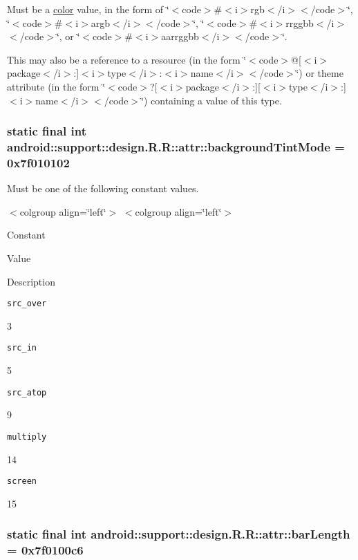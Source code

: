 Must be a \hyperlink{classandroid_1_1support_1_1design_1_1_r_1_1color}{color} value, in the form of \char`\"{}$<$code$>$\#$<$i$>$rgb$<$/i$>$$<$/code$>$\char`\"{}, \char`\"{}$<$code$>$\#$<$i$>$argb$<$/i$>$$<$/code$>$\char`\"{}, \char`\"{}$<$code$>$\#$<$i$>$rrggbb$<$/i$>$$<$/code$>$\char`\"{}, or \char`\"{}$<$code$>$\#$<$i$>$aarrggbb$<$/i$>$$<$/code$>$\char`\"{}. 

This may also be a reference to a resource (in the form \char`\"{}$<$code$>$@\mbox{[}$<$i$>$package$<$/i$>$:\mbox{]}$<$i$>$type$<$/i$>$:$<$i$>$name$<$/i$>$$<$/code$>$\char`\"{}) or theme attribute (in the form \char`\"{}$<$code$>$?\mbox{[}$<$i$>$package$<$/i$>$:\mbox{]}\mbox{[}$<$i$>$type$<$/i$>$:\mbox{]}$<$i$>$name$<$/i$>$$<$/code$>$\char`\"{}) containing a value of this type. \hypertarget{classandroid_1_1support_1_1design_1_1_r_1_1attr_6a64f2f6883574430691e7dc3a1b1c05}{
\subsubsection[{backgroundTintMode}]{\setlength{\rightskip}{0pt plus 5cm}static final int android::support::design.R.R::attr::backgroundTintMode = 0x7f010102}}
\label{classandroid_1_1support_1_1design_1_1_r_1_1attr_6a64f2f6883574430691e7dc3a1b1c05}


Must be one of the following constant values. \begin{TabularC}{0}
\hline
\end{TabularC}
$<$colgroup align=\char`\"{}left\char`\"{}$>$ $<$colgroup align=\char`\"{}left\char`\"{}$>$ 

Constant

Value

Description 

{\tt src\_\-over}

3

{\tt src\_\-in}

5

{\tt src\_\-atop}

9

{\tt multiply}

14

{\tt screen}

15\hypertarget{classandroid_1_1support_1_1design_1_1_r_1_1attr_efe1f8d8b6c1d079593afc0003962dca}{
\subsubsection[{barLength}]{\setlength{\rightskip}{0pt plus 5cm}static final int android::support::design.R.R::attr::barLength = 0x7f0100c6}}
\label{classandroid_1_1support_1_1design_1_1_r_1_1attr_efe1f8d8b6c1d079593afc0003962dca}


